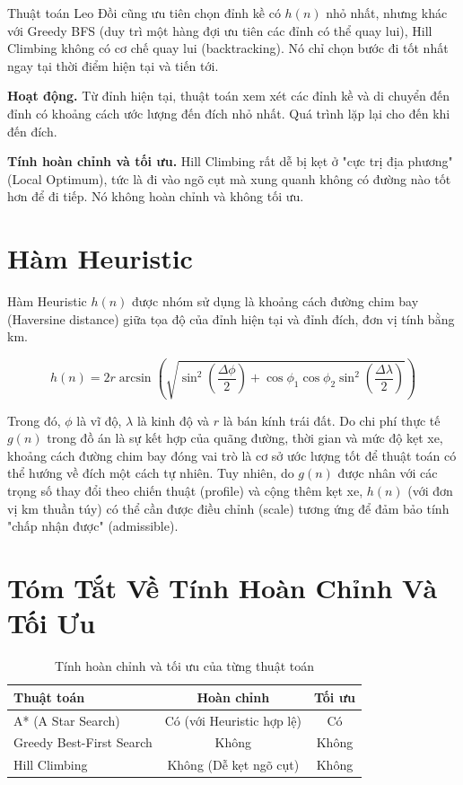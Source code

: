 Thuật toán Leo Đồi cũng ưu tiên chọn đỉnh kề có $h(n)$ nhỏ nhất, nhưng khác với Greedy BFS (duy trì một hàng đợi ưu tiên các đỉnh có thể quay lui), Hill Climbing không có cơ chế quay lui (backtracking). Nó chỉ chọn bước đi tốt nhất ngay tại thời điểm hiện tại và tiến tới.

\textbf{Hoạt động.} Từ đỉnh hiện tại, thuật toán xem xét các đỉnh kề và di chuyển đến đỉnh có khoảng cách ước lượng đến đích nhỏ nhất. Quá trình lặp lại cho đến khi đến đích.

\textbf{Tính hoàn chỉnh và tối ưu.} Hill Climbing rất dễ bị kẹt ở "cực trị địa phương" (Local Optimum), tức là đi vào ngõ cụt mà xung quanh không có đường nào tốt hơn để đi tiếp. Nó không hoàn chỉnh và không tối ưu.

\section{Hàm Heuristic}

Hàm Heuristic $h(n)$ được nhóm sử dụng là khoảng cách đường chim bay (Haversine distance) giữa tọa độ của đỉnh hiện tại và đỉnh đích, đơn vị tính bằng km.

\begin{equation}
h(n) = 2r \arcsin\left(\sqrt{\sin^2\left(\frac{\Delta \phi}{2}\right) + \cos\phi_1 \cos\phi_2 \sin^2\left(\frac{\Delta \lambda}{2}\right)}\right)
\end{equation}

Trong đó, $\phi$ là vĩ độ, $\lambda$ là kinh độ và $r$ là bán kính trái đất. Do chi phí thực tế $g(n)$ trong đồ án là sự kết hợp của quãng đường, thời gian và mức độ kẹt xe, khoảng cách đường chim bay đóng vai trò là cơ sở ước lượng tốt để thuật toán có thể hướng về đích một cách tự nhiên. Tuy nhiên, do $g(n)$ được nhân với các trọng số thay đổi theo chiến thuật (profile) và cộng thêm kẹt xe, $h(n)$ (với đơn vị km thuần túy) có thể cần được điều chỉnh (scale) tương ứng để đảm bảo tính "chấp nhận được" (admissible).

\section{Tóm Tắt Về Tính Hoàn Chỉnh Và Tối Ưu}

\begin{table}[h!]
\centering
\caption{Tính hoàn chỉnh và tối ưu của từng thuật toán}
\begin{tabular}{lcc}
\toprule
Thuật toán & Hoàn chỉnh & Tối ưu \\
\midrule
A* (A Star Search) & Có (với Heuristic hợp lệ) & Có \\
Greedy Best-First Search & Không & Không \\
Hill Climbing & Không (Dễ kẹt ngõ cụt) & Không \\
\bottomrule
\end{tabular}
\end{table}
